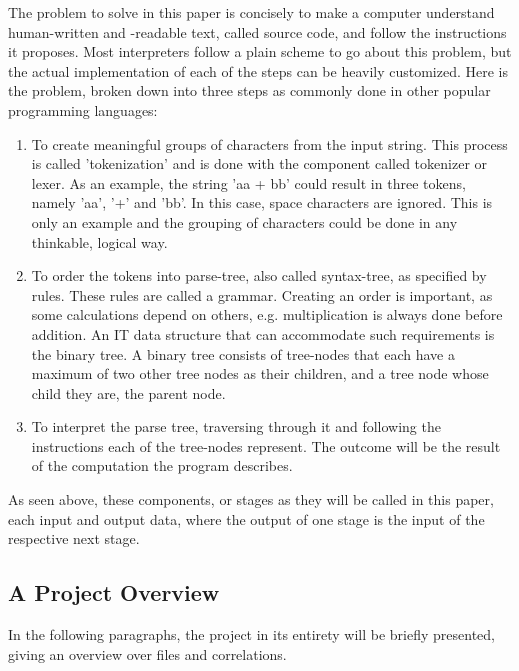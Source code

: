 \documentclass[12pt,a4paper]{article}
\newcommand{\pagelabel}[1]{\phantomsection\label{#1}}
\begin{document}
The problem to solve in this paper is concisely to make a computer understand
human-written and -readable text, called source code, and follow the instructions
it proposes.
Most interpreters follow a plain scheme to go about this problem, but the
actual implementation of each of the steps can be heavily customized.
Here is the problem, broken down into three steps as commonly done in other
popular programming languages:
\begin{enumerate}\pagelabel{simple interpreter}
    \item To create meaningful groups of characters from the input string. This
        process is called 'tokenization' and is done with the component called
        tokenizer or lexer. As an example, the string 'aa + bb' could result
        in three tokens, namely 'aa', '+' and 'bb'. In this case, space characters
        are ignored. 
        This is only an example and the grouping of characters could be done 
        in any thinkable, logical way.
    \item To order the tokens into parse-tree, also called syntax-tree, as
        specified by rules. These rules are called a grammar.
        Creating an order is important, as some calculations depend on others, e.g. multiplication
        is always done before addition. An IT data structure that can accommodate
        such requirements is the binary tree. A binary tree consists of tree-nodes
        that each have a maximum of two other tree nodes as their children, and
        a tree node whose child they are, the parent node.
    \item To interpret the parse tree, traversing through it and following the
        instructions each of the tree-nodes represent. The outcome
        will be the result of the computation the program describes.
\end{enumerate}

As seen above, these components, or stages as they will be called in this paper,
each input and output data, where the output of one stage is the input of the
respective next stage.

\subsection{A Project Overview}
In the following paragraphs, the project in its entirety will be briefly
presented, giving an overview over files and correlations.
\end{document}
